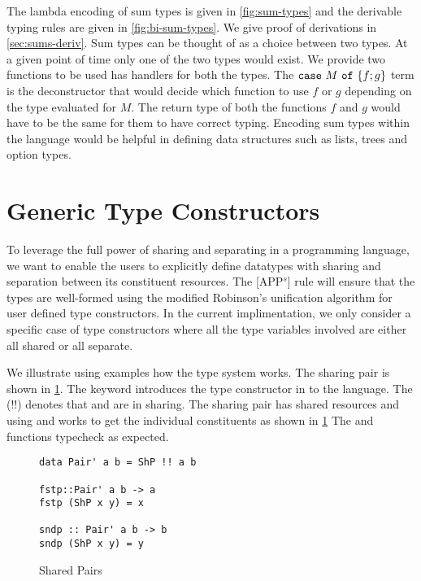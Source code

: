 The lambda encoding of sum types is given in \cref{fig:sum-types} and the derivable typing rules are given in \cref{fig:bi-sum-types}.
We give proof of derivations in \cref{sec:sums-deriv}. Sum types can be thought of as a choice between two types. At a given point of
time only one of the two types would exist. We provide two functions to be used has handlers for both the types. The $\texttt{case}\ M\ \texttt{of}\ \{f;g\}$ term
is the deconstructor that would decide which function to use $f$ or $g$ depending on the type evaluated for $M$. The return type
of both the functions $f$ and $g$ would have to be the same for them to have correct typing. Encoding sum types within the language would be
helpful in defining data structures such as lists, trees and option types.


\section{Generic Type Constructors}\label{sec:type-constructors}
To leverage the full power of sharing and separating in a programming language,
we want to enable the users to explicitly define datatypes with sharing and separation between its
constituent resources. The [APP$^s$] rule will ensure that the types are well-formed using the modified
Robinson's unification algorithm for user defined type constructors.
In the current implimentation, we only consider a specific case of type constructors where all the type variables
involved are either all shared or all separate. %

We illustrate using examples how the type system works. The sharing pair is shown in \cref{fig:sharing-pair}.
The keyword  introduces the type constructor in to the language. The (!!) denotes that  and  are in sharing.
The sharing pair has shared resources and using \Fst{} and \Snd{} works
to get the individual constituents as shown in \cref{fig:sharing-pair}
The  and  functions typecheck as expected.

\begin{figure}[h]
  \begin{framed}
\begin{verbatim}
data Pair' a b = ShP !! a b

fstp::Pair' a b -> a
fstp (ShP x y) = x

sndp :: Pair' a b -> b
sndp (ShP x y) = y
\end{verbatim}
  \end{framed}

  \caption{Shared Pairs}
  \label{fig:sharing-pair}
\end{figure}

